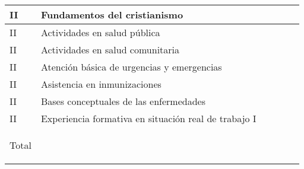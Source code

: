 \documentclass[9pt,a4paper]{article}
\begin{document}
\begin{table}[ht]
\begin{tabular}{|m{0.7cm}|m{7cm}|m{1.4cm}|m{1.4cm}|m{1.4cm}|m{1.4cm}|}
		{\parbox{0.7cm}{\centering II}}       & 
		Fundamentos del cristianismo          & 
		{\parbox{1.4cm}{ }}       & 
		{\parbox{1.4cm}{ }}      & 
		{\parbox{1.4cm}{  }}      & 
		{\parbox{1.4cm}{ }}      \\
		\hline
		{\parbox{0.7cm}{\centering II}}       & 
		Actividades en salud pública          & 
		{\parbox{1.4cm}{ }}       & 
		{\parbox{1.4cm}{ }}      & 
		{\parbox{1.4cm}{  }}     & 
		{\parbox{1.4cm}{ }}      \\
		\hline
		{\parbox{0.7cm}{\centering II}}       & 
		Actividades en salud comunitaria      & 
		{\parbox{1.4cm}{ }}       & 
		{\parbox{1.4cm}{ }}      & 
		{\parbox{1.4cm}{  }}     & 
		{\parbox{1.4cm}{ }}      \\
		\hline
		{\parbox{0.7cm}{\centering II}}       & 
		Atención básica de urgencias y emergencias & 
		{\parbox{1.4cm}{ }}       & 
		{\parbox{1.4cm}{ }}      & 
		{\parbox{1.4cm}{  }}      & 
		{\parbox{1.4cm}{ }}      \\
		\hline
		{\parbox{0.7cm}{\centering II}}       & 
		Asistencia en inmunizaciones          & 
		{\parbox{1.4cm}{ }}       & 
		{\parbox{1.4cm}{ }}      & 
		{\parbox{1.4cm}{  }}      & 
		{\parbox{1.4cm}{ }}      \\
		\hline
		{\parbox{0.7cm}{\centering II}}       & 
		Bases conceptuales de las enfermedades& 
		{\parbox{1.4cm}{ }}       & 
		{\parbox{1.4cm}{ }}      & 
		{\parbox{1.4cm}{  }}      & 
		{\parbox{1.4cm}{ }}      \\
		\hline
		{\parbox{0.7cm}{\centering II}}       & 
		Experiencia formativa en situación real de trabajo I& 
		{\parbox{1.4cm}{ }}       & 
		{\parbox{1.4cm}{ }}      & 
		{\parbox{1.4cm}{}}     & 
		{\parbox{1.4cm}{}}     \\
		\hline
		\rowcolor{azul}
		\textcolor{blanco}{\parbox{0.7cm}{\centering Total}}    & 
		                                                        & 
		\textcolor{blanco}{\parbox{1.4cm}{ }}      & 
		\textcolor{blanco}{\parbox{1.4cm}{ }}     & 
		\textcolor{blanco}{\parbox{1.4cm}{  }}    & 
		\textcolor{blanco}{\parbox{1.4cm}{ }}     \\
		\hline

\end{tabular}
\end{table}
\end{document}

